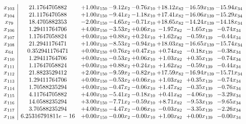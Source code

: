 \documentclass[8pt]{article}
\begin{document}
\[\begin{array}{c| c c@{\hskip 2pt} c@{\hskip 2pt} c@{\hskip 2pt} c@{\hskip 2pt} c@{\hskip 2pt} c@{\hskip 2pt} }
 x_{103}   &  21.1764705882 & +  1.00 x_{150} & -9.12 x_{2} & -0.76 x_{10} & + 18.12 x_{82} & -16.59 x_{139} & -15.94 x_{34}\\
 x_{104}   &  21.1176470588 & +  1.00 x_{150} & -9.41 x_{2} & -1.18 x_{10} & + 17.41 x_{82} & -16.06 x_{139} & -15.29 x_{34}\\
 x_{79}   &  18.4705882353 & -2.00 x_{150} & -4.65 x_{2} & -0.71 x_{10} & + 18.65 x_{82} & -14.24 x_{139} & -14.18 x_{34}\\
 x_{106}   &  1.29411764706 & +  4.00 x_{150} & -3.53 x_{2} & +  0.06 x_{10} & -1.97 x_{82} & -1.65 x_{139} & -0.74 x_{34}\\
 x_{107}   &  1.17647058824 & +  0.00 x_{150} & +  0.88 x_{2} & +  0.24 x_{10} & +  1.62 x_{82} & -0.59 x_{139} & -0.44 x_{34}\\
 x_{108}   &  21.2941176471 & +  1.00 x_{150} & -8.53 x_{2} & -0.94 x_{10} & + 18.03 x_{82} & -16.65 x_{139} & -15.74 x_{34}\\
 x_{64}   &  0.352941176471 & +  0.00 x_{150} & +  0.76 x_{2} & +  0.47 x_{10} & +  0.74 x_{82} & -0.18 x_{139} & -0.38 x_{34}\\
 x_{110}   &  1.29411764706 & +  0.00 x_{150} & -0.53 x_{2} & +  0.06 x_{10} & +  1.03 x_{82} & +  0.35 x_{139} & -0.74 x_{34}\\
 x_{111}   &  1.17647058824 & +  0.00 x_{150} & +  0.88 x_{2} & +  0.24 x_{10} & +  1.62 x_{82} & -0.59 x_{139} & -0.44 x_{34}\\
 x_{112}   &  21.8823529412 & +  2.00 x_{150} & -9.59 x_{2} & -0.82 x_{10} & + 17.59 x_{82} & -16.94 x_{139} & -15.71 x_{34}\\
 x_{113}   &  1.29411764706 & +  0.00 x_{150} & -0.53 x_{2} & +  0.06 x_{10} & +  1.03 x_{82} & +  0.35 x_{139} & -0.74 x_{34}\\
 x_{114}   &  1.70588235294 & +  0.00 x_{150} & -0.47 x_{2} & -0.06 x_{10} & +  1.47 x_{82} & -0.35 x_{139} & -0.76 x_{34}\\
 x_{115}   &  4.11764705882 & +  4.00 x_{150} & -5.41 x_{2} & -0.18 x_{10} & +  0.41 x_{82} & -4.06 x_{139} & -3.29 x_{34}\\
 x_{116}   &  14.0588235294 & +  3.00 x_{150} & -7.71 x_{2} & -0.59 x_{10} & +  8.71 x_{82} & -9.53 x_{139} & -9.65 x_{34}\\
 x_{117}   &  3.70588235294 & +  4.00 x_{150} & -4.47 x_{2} & -0.06 x_{10} & -0.03 x_{82} & -3.35 x_{139} & -2.26 x_{34}\\
 x_{118}   &  6.25316791811e-16 & +  0.00 x_{150} & -0.00 x_{2} & -0.00 x_{10} & +  1.00 x_{82} & +  0.00 x_{139} & -0.00 x_{34}\\

\end{array}\]
\end{document}
